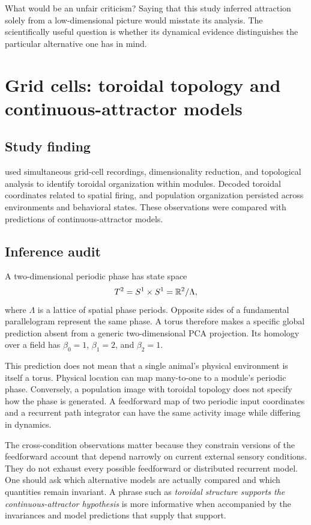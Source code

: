 \begin{insight}{What would be an unfair criticism?}
Saying that this study inferred attraction solely from a low-dimensional picture would misstate its analysis. The scientifically useful question is whether its dynamical evidence distinguishes the particular alternative one has in mind.
\end{insight}

\section{Grid cells: toroidal topology and continuous-attractor models}
\subsection{Study finding}
\citet{app_gardner2022} used simultaneous grid-cell recordings, dimensionality reduction, and topological analysis to identify toroidal organization within modules. Decoded toroidal coordinates related to spatial firing, and population organization persisted across environments and behavioral states. These observations were compared with predictions of continuous-attractor models.

\subsection{Inference audit}
A two-dimensional periodic phase has state space
\[
T^2=S^1\times S^1
=\mathbb{R}^2/\Lambda,
\]
where \(\Lambda\) is a lattice of spatial phase periods. Opposite sides of a fundamental parallelogram represent the same phase. A torus therefore makes a specific global prediction absent from a generic two-dimensional PCA projection. Its homology over a field has \(\beta_0=1\), \(\beta_1=2\), and \(\beta_2=1\).

This prediction does not mean that a single animal's physical environment is itself a torus. Physical location can map many-to-one to a module's periodic phase. Conversely, a population image with toroidal topology does not specify how the phase is generated. A feedforward map of two periodic input coordinates and a recurrent path integrator can have the same activity image while differing in dynamics.

The cross-condition observations matter because they constrain versions of the feedforward account that depend narrowly on current external sensory conditions. They do not exhaust every possible feedforward or distributed recurrent model. One should ask which alternative models are actually compared and which quantities remain invariant. A phrase such as \emph{toroidal structure supports the continuous-attractor hypothesis} is more informative when accompanied by the invariances and model predictions that supply that support.

